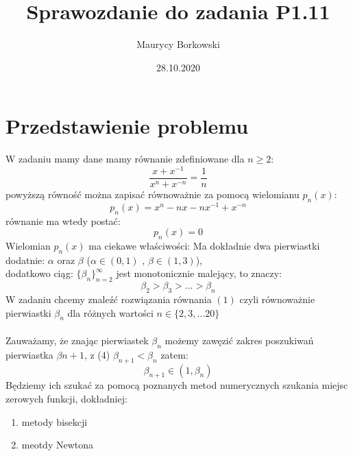 \documentclass{article}
\title{Sprawozdanie do zadania \textbf{P1.11}}
\date{28.10.2020}
\author{Maurycy Borkowski}
\begin{document}
\maketitle
\section{Przedstawienie problemu}
W zadaniu mamy dane mamy równanie zdefiniowane dla $n \geq 2$:
\begin{equation}
\frac{x + x^{-1}}{x^n + x^{-n}} = \frac{1}{n}
\end{equation}
powyższą równość można zapisać równoważnie za pomocą wielomianu $p_n(x)$:
\begin{equation}
p_n(x) = x^n - nx - nx^{-1} + x^{-n}
\end{equation}
równanie ma wtedy postać:
\begin{equation}
p_n(x) = 0
\end{equation}
Wielomian $p_n(x)$ ma ciekawe właściwości:
\newline Ma dokładnie dwa pierwiastki dodatnie: $\alpha$ oraz $\beta$ ($\alpha \in (0,1)$ , $\beta \in (1,3)$), \\dodatkowo ciąg: $\{\beta_n\}^\infty_{n=2}$ jest monotonicznie malejący, to znaczy:
\begin{equation}
\beta_2 > \beta_3 > \ldots > \beta_n
\end{equation}
W zadaniu chcemy znaleźć rozwiązania równania $(1)$ czyli równoważnie pierwiastki $\beta_n$ dla różnych wartości $n \in \{2,3,\ldots 20\}$\\\\
Zauważamy, że znając pierwiastek $\beta_n$ możemy zawęzić zakres poszukiwań pierwiastka $\beta{n+1}$, z (4) $\beta_{n+1} < \beta_{n}$ zatem:
\begin{equation}
\beta_{n+1} \in (1,\beta_n)
\end{equation}
Będziemy ich szukać za pomocą poznanych metod numerycznych szukania miejsc zerowych funkcji, dokładniej:
\begin{enumerate}[label=(\alph*)]
\item metody bisekcji
\item meotdy Newtona
\end{enumerate}
\end{document}
